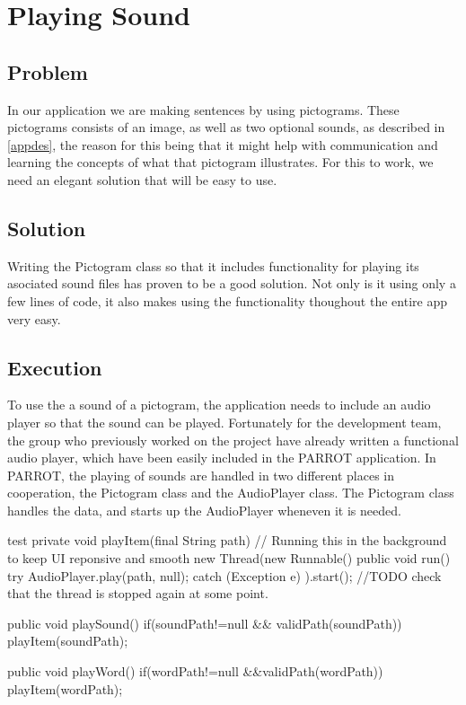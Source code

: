 \section{Playing Sound}
\subsection*{Problem}
In our application we are making sentences by using pictograms. These pictograms consists of an image, as well as two optional sounds, as described in \autoref{appdes}, the reason for this being that it might help with communication and learning the concepts of what that pictogram illustrates.
For this to work, we need an elegant solution that will be easy to use.

\subsection*{Solution}
Writing the Pictogram class so that it includes functionality for playing its asociated sound files has proven to be a good solution. Not only is it using only a few lines of code, it also makes using the functionality thoughout the entire app very easy.

\subsection*{Execution}
To use the a sound of a pictogram, the application needs to include an audio player so that the sound can be played. Fortunately for the development team, the group who previously worked on the project have already written a functional audio player, which have been easily included in the PARROT application.\newline
In PARROT, the playing of sounds are handled in two different places in cooperation, the Pictogram class and the AudioPlayer class.\newline
The Pictogram class handles the data, and starts up the AudioPlayer wheneven it is needed.\newline

\begin{source}{test}{}
	private void playItem(final String path) {
		// Running this in the background to keep UI reponsive and smooth
		new Thread(new Runnable() {
			public void run() {
				try {
					AudioPlayer.play(path, null);
				} catch (Exception e) {
				}
			}
		}).start();
		//TODO check that the thread is stopped again at some point.
	}

	public void playSound()
	{
		if(soundPath!=null && validPath(soundPath))
		{
			playItem(soundPath);
		}
	}

	public void playWord()
	{
		if(wordPath!=null &&validPath(wordPath))
		{
			playItem(wordPath);
		}
	}
\end{source}

